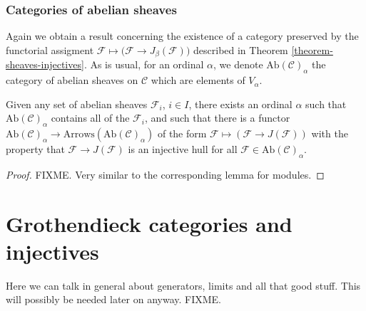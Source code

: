 \subsubsection{Categories of abelian sheaves}
\label{subsubsection-abelian-sheaves}

\noindent
Again we obtain a result concerning the existence of a category 
preserved by the functorial assigment $\mathcal{F} \mapsto
\big(\mathcal{F} \to J_\beta(\mathcal{F})\big)$ described in
Theorem \ref{theorem-sheaves-injectives}. As is usual, for an
ordinal $\alpha$, we denote $\text{Ab}(\mathcal{C})_\alpha$ the
category of abelian sheaves on $\mathcal{C}$ which are elements
of $V_\alpha$.

\begin{lemma}
\label{lemma-injective-sheaf-preserves-category}
Given any set of abelian sheaves $\mathcal{F}_i$, $i\in I$, there
exists an ordinal $\alpha$ such that $\text{Ab}(\mathcal{C})_\alpha$
contains all of the $\mathcal{F}_i$, and such that there is a functor
$\text{Ab}(\mathcal{C})_\alpha \to
\text{Arrows}(\text{Ab}(\mathcal{C})_\alpha)$
of the form $\mathcal{F} \mapsto (\mathcal{F} \to J(\mathcal{F}))$
with the property that $\mathcal{F} \to J(\mathcal{F})$ is an injective
hull for all $\mathcal{F} \in \text{Ab}(\mathcal{C})_\alpha$.
\end{lemma}

\begin{proof}
FIXME. Very similar to the corresponding lemma for modules.
\end{proof}

\section{Grothendieck categories and injectives}

\noindent
Here we can talk in general about generators, limits and
all that good stuff. This will possibly be needed later on
anyway. FIXME.









